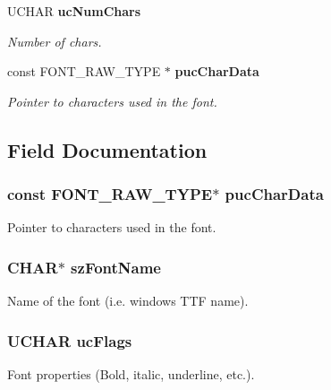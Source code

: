 \begin{DoxyCompactItemize}
UCHAR {\bf ucNumChars}
\begin{DoxyCompactList}\small\item\em Number of chars. \item\end{DoxyCompactList}\item 
const FONT\_\-RAW\_\-TYPE $\ast$ {\bf pucCharData}
\begin{DoxyCompactList}\small\item\em Pointer to characters used in the font. \item\end{DoxyCompactList}\end{DoxyCompactItemize}


\subsection{Field Documentation}
\subsubsection[{pucCharData}]{\setlength{\rightskip}{0pt plus 5cm}const FONT\_\-RAW\_\-TYPE$\ast$ {\bf pucCharData}}\label{struct_f_o_n_t___s_t_r_u_c_t_aa9aaeae61a07b9292d47244a9798432f}


Pointer to characters used in the font. 
\subsubsection[{szFontName}]{\setlength{\rightskip}{0pt plus 5cm}CHAR$\ast$ {\bf szFontName}}\label{struct_f_o_n_t___s_t_r_u_c_t_ac072a8234688e68c75c3a2d0386ac47f}


Name of the font (i.e. windows TTF name). 
\subsubsection[{ucFlags}]{\setlength{\rightskip}{0pt plus 5cm}UCHAR {\bf ucFlags}}\label{struct_f_o_n_t___s_t_r_u_c_t_a2ada1d295bf9a3a5454233ae6e0391ee}


Font properties (Bold, italic, underline, etc.). 
